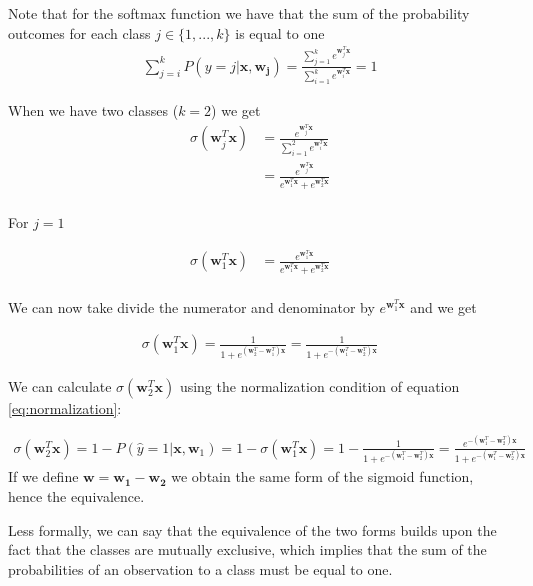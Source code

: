 \documentclass[a4paper]{article}
\begin{document}
Note that for the softmax function we have that the sum of the probability outcomes for each class $j \in \{1,...,k\}$ is equal to one
\begin{align} \label{eq:normalization}
    \sum_{j=i}^{k} P(y=j | \mathbf{x}, \mathbf{w_j}) =
    \frac{\sum^k_{j=1}e^{\mathbf{w}^T_j\mathbf{x}}}{\sum^k_{i=1}e^{\mathbf{w}^T_i\mathbf{x}}} =
    1
\end{align}

When we have two classes ($k = 2$) we get
\begin{align*}
\sigma(\mathbf{w}^T_j\mathbf{x}) &= \frac{e^{\mathbf{w}^T_j\mathbf{x}}}{\sum^2_{i=1}e^{\mathbf{w}^T_i\mathbf{x}}} \\
&= \frac{e^{\mathbf{w}^T_j\mathbf{x}}}{e^{\mathbf{w}^T_1\mathbf{x}} + e^{\mathbf{w}^T_2\mathbf{x}}} \\
\end{align*}

For $j = 1$

\begin{align*}
\sigma(\mathbf{w}^T_1\mathbf{x}) &= \frac{e^{\mathbf{w}^T_1\mathbf{x}}}{e^{\mathbf{w}^T_1\mathbf{x}} + e^{\mathbf{w}^T_2\mathbf{x}}} \\
\end{align*}

We can now take divide the numerator and denominator by $e^{\mathbf{w}^T_1\mathbf{x}}$ and we get

\begin{align*}
\sigma(\mathbf{w}^T_1\mathbf{x}) = \frac{1}{1 + e^{(\mathbf{w}^T_2-\mathbf{w}^T_1)\mathbf{x}}} 
= \frac{1}{1 + e^{- (\mathbf{w}^T_1-\mathbf{w}^T_2)\mathbf{x}}}
\end{align*}

We can calculate $\sigma(\mathbf{w}^T_2\mathbf{x})$ using the normalization condition of equation \ref{eq:normalization}:

\begin{align*}
\sigma(\mathbf{w}^T_2\mathbf{x}) = 1 - P(\hat{y} = 1 | \mathbf{x},\mathbf{w}_1) = 1 - \sigma(\mathbf{w}^T_1\mathbf{x}) = 1 - \frac{1}{1 + e^{- (\mathbf{w}^T_1-\mathbf{w}^T_2)\mathbf{x}}} = \frac{e^{- (\mathbf{w}^T_1-\mathbf{w}^T_2)\mathbf{x}}}{1 + e^{- (\mathbf{w}^T_1-\mathbf{w}^T_2)\mathbf{x}}}
\end{align*}
If we define $\mathbf{w} = \mathbf{w_1} - \mathbf{w_2}$ we obtain the same form of the sigmoid function, hence the equivalence.

Less formally, we can say that the equivalence of the two forms builds upon the fact that the classes are mutually exclusive, which implies that the sum of the probabilities of an observation to a class must be equal to one.
\end{document}
